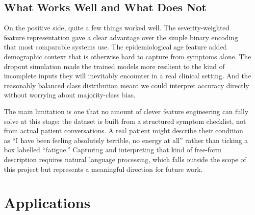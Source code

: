 \documentclass[12pt,a4paper]{article}
\begin{document}
\subsection{What Works Well and What Does Not}

On the positive side, quite a few things worked well. The severity-weighted feature representation gave a clear advantage over the simple binary encoding that most comparable systems use. The epidemiological age feature added demographic context that is otherwise hard to capture from symptoms alone. The dropout simulation made the trained models more resilient to the kind of incomplete inputs they will inevitably encounter in a real clinical setting. And the reasonably balanced class distribution meant we could interpret accuracy directly without worrying about majority-class bias.

The main limitation is one that no amount of clever feature engineering can fully solve at this stage: the dataset is built from a structured symptom checklist, not from actual patient conversations. A real patient might describe their condition as ``I have been feeling absolutely terrible, no energy at all'' rather than ticking a box labelled ``fatigue.'' Capturing and interpreting that kind of free-form description requires natural language processing, which falls outside the scope of this project but represents a meaningful direction for future work.

\section{Applications}
\end{document}
